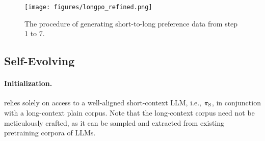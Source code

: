 


\begin{figure}
    \centering
    \texttt{[image: figures/longpo\_refined.png]}
    \caption{The procedure of generating short-to-long preference data from step 1 to 7.}
    \label{fig:data_generation}
\end{figure}

\subsection{Self-Evolving}
\label{subsec:self_evolve}
\paragraph{Initialization.} \ourMethod{} relies solely on access to a well-aligned short-context LLM, i.e., $\pi_\text{S}$, in conjunction with a long-context plain corpus. Note that the long-context corpus need not be meticulously crafted, as it can be sampled and extracted from existing pretraining corpora of LLMs.



